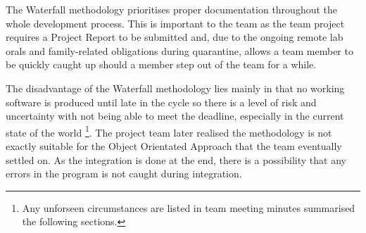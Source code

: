 \documentclass[12pt,a4paper]{article}
\begin{document}
	The Waterfall methodology prioritises proper documentation throughout the whole development process. This is important
	to the team as the team project requires a Project Report to be submitted and, due to the ongoing remote lab orals and 
	family-related obligations during quarantine, allows a team member to be quickly caught up should a member step out
	of the team for a while.  

	The disadvantage of the Waterfall methodology lies mainly in that no working software is produced until late in the 
	cycle so there is a level of risk and uncertainty with not being able to meet the deadline, especially in the 
	current state of the world \footnote{Any unforseen circumstances are listed in team meeting minutes summarised the following sections.}. 
	The project team later realised the methodology is not exactly suitable for the Object Orientated Approach 
	that the team eventually settled on. As the integration is done at the end, there is a possibility that any errors
	in the program is not caught during integration.

	\vfill
	\pagebreak
\end{document}
